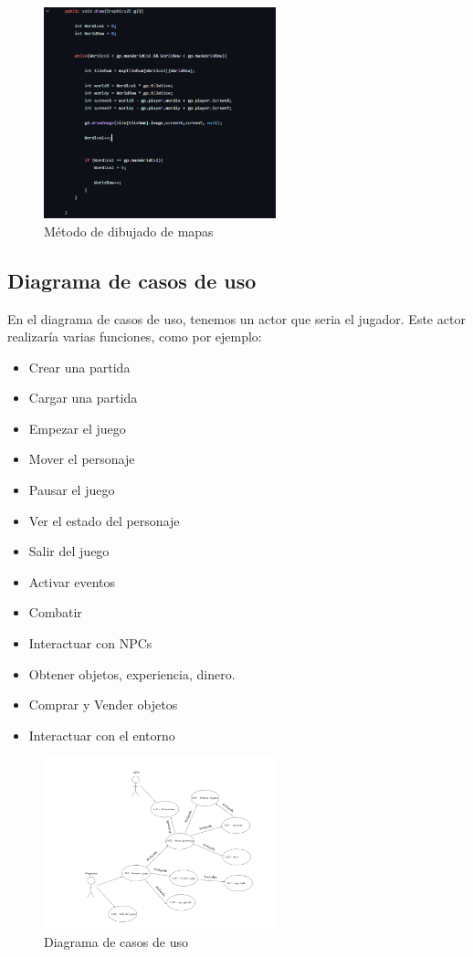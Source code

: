 \documentclass[a4paper]{article}
\begin{document}
\begin{figure}[ht]
    \centering
    \includegraphics[width=0.6\textwidth]{Images/draw.PNG}
    \caption{Método de dibujado de mapas}
    \label{fig:metodos}
\end{figure}


\clearpage
\subsection{Diagrama de casos de uso}
En el diagrama de casos de uso, tenemos un actor que seria el jugador. Este actor realizaría varias funciones, como por ejemplo:
\begin{itemize}
    \item Crear una partida
    \item Cargar una partida
    \item Empezar el juego
    \item Mover el personaje
    \item Pausar el juego
    \item Ver el estado del personaje
    \item Salir del juego
    \item Activar eventos
    \item Combatir
    \item Interactuar con NPCs
    \item Obtener objetos, experiencia, dinero.
    \item Comprar y Vender objetos
    \item Interactuar con el entorno
\end{itemize}

\begin{figure}[ht]
    \centering
    \includegraphics[width=0.6\textwidth]{Images/diagramaCU.PNG}
    \caption{Diagrama de casos de uso}
    \label{fig:diagramas}
\end{figure}
\end{document}
